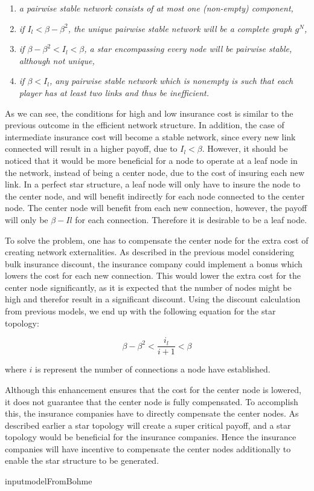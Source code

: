 \begin{enumerate}

\item \textit{a pairwise stable network consists of at most one (non-empty) component,}
\item \textit{if $I_{l}<\beta - \beta^2$, the unique pairwise stable network will be a complete graph $g^N$, }
\item \textit{if $\beta - \beta^2 < I_{l} < \beta $, a star encompassing every node will be pairwise stable, although not unique,}
\item \textit{if $\beta < I_{l}$, any pairwise stable network which is nonempty is such that each player has at least two links and thus be inefficient. }
\end{enumerate}

As we can see, the conditions for high and low insurance cost is similar to the previous outcome in the efficient network structure. In addition, the case of intermediate insurance cost will become a stable network, since every new link connected will result in a higher payoff, due to $I_{l} < \beta$. However, it should be noticed that it would be more beneficial for a node to operate at a leaf node in the network, instead of being a center node, due to the cost of insuring each new link. In a perfect star structure, a leaf node will only have to insure the node to the center node, and will benefit indirectly for each node connected to the center node. The center node will benefit from each new connection, however, the payoff will only be $\beta - I{l}$ for each connection. Therefore it is desirable to be a leaf node. 

To solve the problem, one has to compensate the center node for the extra cost of creating network externalities. As described in the previous model considering bulk insurance discount, the insurance company could implement a bonus which lowers the cost for each new connection. This would lower the extra cost for the center node significantly, as it is expected that the number of nodes might be high and therefor result in a significant discount. 
Using the discount calculation from previous models, we end up with the following equation for the star topology:

\begin{equation}
\beta-\beta^2<\frac{i_{l}}{i+1}< \beta
\end{equation}



where $i $ is represent the number of connections a node have established. 

Although this enhancement ensures that the cost for the center node is lowered, it does not guarantee that the center node is fully compensated. To accomplish this, the insurance companies have to directly compensate the center nodes. As described earlier a star topology will create a super critical payoff, and a star topology would be beneficial for the insurance companies. Hence the insurance companies will have incentive to compensate the center nodes additionally to enable the star structure to be generated. 

input{modelFromBohme}

